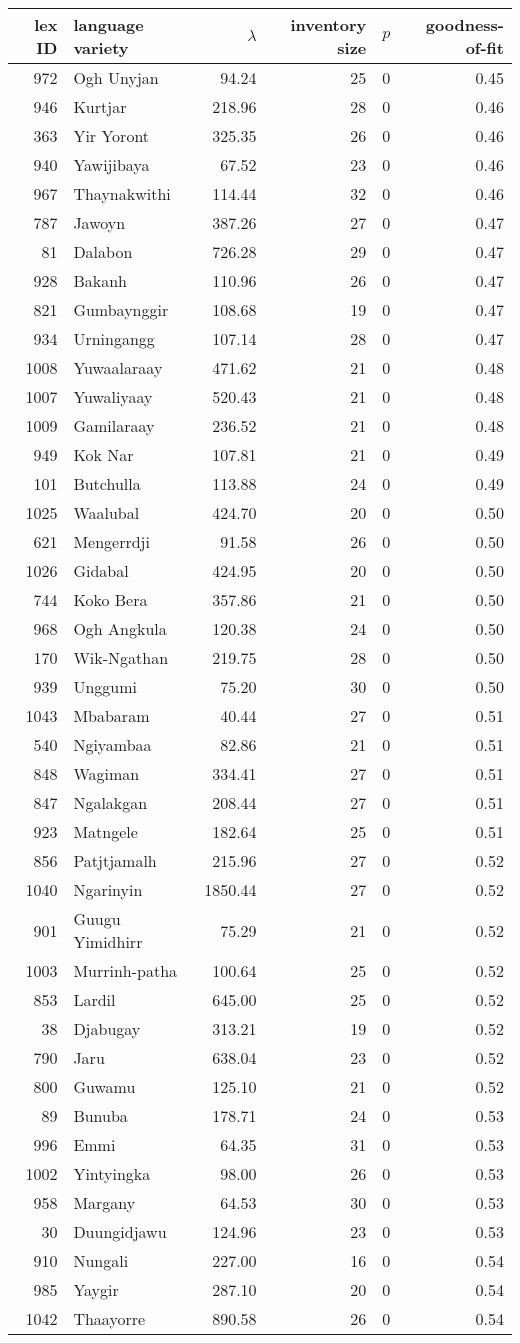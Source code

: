 \begin{longtable}[]{@{}rlrrrr@{}}
\toprule
\textbf{lex ID} & \textbf{language variety} & \(\lambda\) &
\textbf{inventory size} & \(p\) &
\textbf{goodness-of-fit}\tabularnewline
\midrule
\endhead
972 & Ogh Unyjan & 94.24 & 25 & 0 & 0.45\tabularnewline
946 & Kurtjar & 218.96 & 28 & 0 & 0.46\tabularnewline
363 & Yir Yoront & 325.35 & 26 & 0 & 0.46\tabularnewline
940 & Yawijibaya & 67.52 & 23 & 0 & 0.46\tabularnewline
967 & Thaynakwithi & 114.44 & 32 & 0 & 0.46\tabularnewline
787 & Jawoyn & 387.26 & 27 & 0 & 0.47\tabularnewline
81 & Dalabon & 726.28 & 29 & 0 & 0.47\tabularnewline
928 & Bakanh & 110.96 & 26 & 0 & 0.47\tabularnewline
821 & Gumbaynggir & 108.68 & 19 & 0 & 0.47\tabularnewline
934 & Urningangg & 107.14 & 28 & 0 & 0.47\tabularnewline
1008 & Yuwaalaraay & 471.62 & 21 & 0 & 0.48\tabularnewline
1007 & Yuwaliyaay & 520.43 & 21 & 0 & 0.48\tabularnewline
1009 & Gamilaraay & 236.52 & 21 & 0 & 0.48\tabularnewline
949 & Kok Nar & 107.81 & 21 & 0 & 0.49\tabularnewline
101 & Butchulla & 113.88 & 24 & 0 & 0.49\tabularnewline
1025 & Waalubal & 424.70 & 20 & 0 & 0.50\tabularnewline
621 & Mengerrdji & 91.58 & 26 & 0 & 0.50\tabularnewline
1026 & Gidabal & 424.95 & 20 & 0 & 0.50\tabularnewline
744 & Koko Bera & 357.86 & 21 & 0 & 0.50\tabularnewline
968 & Ogh Angkula & 120.38 & 24 & 0 & 0.50\tabularnewline
170 & Wik-Ngathan & 219.75 & 28 & 0 & 0.50\tabularnewline
939 & Unggumi & 75.20 & 30 & 0 & 0.50\tabularnewline
1043 & Mbabaram & 40.44 & 27 & 0 & 0.51\tabularnewline
540 & Ngiyambaa & 82.86 & 21 & 0 & 0.51\tabularnewline
848 & Wagiman & 334.41 & 27 & 0 & 0.51\tabularnewline
847 & Ngalakgan & 208.44 & 27 & 0 & 0.51\tabularnewline
923 & Matngele & 182.64 & 25 & 0 & 0.51\tabularnewline
856 & Patjtjamalh & 215.96 & 27 & 0 & 0.52\tabularnewline
1040 & Ngarinyin & 1850.44 & 27 & 0 & 0.52\tabularnewline
901 & Guugu Yimidhirr & 75.29 & 21 & 0 & 0.52\tabularnewline
1003 & Murrinh-patha & 100.64 & 25 & 0 & 0.52\tabularnewline
853 & Lardil & 645.00 & 25 & 0 & 0.52\tabularnewline
38 & Djabugay & 313.21 & 19 & 0 & 0.52\tabularnewline
790 & Jaru & 638.04 & 23 & 0 & 0.52\tabularnewline
800 & Guwamu & 125.10 & 21 & 0 & 0.52\tabularnewline
89 & Bunuba & 178.71 & 24 & 0 & 0.53\tabularnewline
996 & Emmi & 64.35 & 31 & 0 & 0.53\tabularnewline
1002 & Yintyingka & 98.00 & 26 & 0 & 0.53\tabularnewline
958 & Margany & 64.53 & 30 & 0 & 0.53\tabularnewline
30 & Duungidjawu & 124.96 & 23 & 0 & 0.53\tabularnewline
910 & Nungali & 227.00 & 16 & 0 & 0.54\tabularnewline
985 & Yaygir & 287.10 & 20 & 0 & 0.54\tabularnewline
1042 & Thaayorre & 890.58 & 26 & 0 & 0.54\tabularnewline

\end{longtable}
